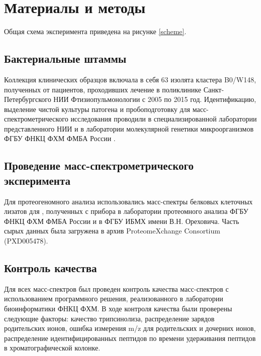 \section{Материалы и методы}
Общая схема эксперимента приведена на рисунке \ref{scheme}.

\subsection{Бактериальные штаммы}
Коллекция клинических образцов включала в себя 63 изолята  кластера B0/W148, полученных от пациентов, проходивших лечение в поликлинике Санкт-Петербургского НИИ Фтизиопульмонологии с 2005 по 2015 год. Идентификацию, выделение чистой культуры патогена и пробоподготовку для масс-спектрометрического исследования проводили в специализированной лаборатории представленного НИИ и в лаборатории молекулярной генетики микроорганизмов ФГБУ ФНКЦ ФХМ ФМБА России \cite{bespyatykh2016proteome}. 

\subsection{Проведение масс-спектрометрического эксперимента}
Для протеогеномного анализа использовались масс-спектры белковых клеточных лизатов для , полученных с прибора  в лаборатории протеомного анализа ФГБУ ФНКЦ ФХМ ФМБА России и  в ФГБУ ИБМХ имени В.Н. Ореховича. Часть сырых данных была загружена в архив ProteomeXchange Consortium \cite{vizcaino2014proteomexchange} (PXD005478).

\subsection{Контроль качества}
Для всех масс-спектров был проведен контроль качества масс-спектров с использованием программного решения, реализованного в лаборатории биоинформатики ФНКЦ ФХМ. В ходе контроля качества были проверены следующие факторы: качество трипсинолиза, распределение зарядов родительских ионов, ошибка измерения m/z для родительских и дочерних ионов, распределение идентифицированных пептидов по времени удерживания пептидов в хроматографической колонке.

